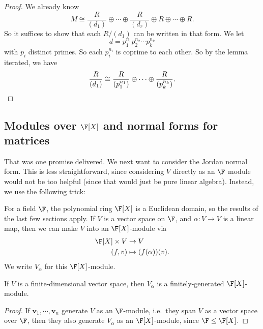 \documentclass[a4paper]{article}
\begin{document}
\begin{proof}
  We already know
  \[
    M \cong \frac{R}{(d_1)} \oplus \cdots \oplus \frac{R}{(d_r)} \oplus R \oplus \cdots \oplus R.
  \]
  So it suffices to show that each $R/(d_1)$ can be written in that form. We let
  \[
    d = p_1^{n_1} p_2^{n_2} \cdots p_k^{n_k}
  \]
  with $p_i$ distinct primes. So each $p_i^{n_i}$ is coprime to each other. So by the lemma iterated, we have
  \[
    \frac{R}{(d_1)} \cong \frac{R}{(p_1^{n_1})} \oplus\cdots \oplus \frac{R}{(p_k^{n_k})}.\qedhere
  \]
\end{proof}

\subsection{Modules over \texorpdfstring{$\F[X]$}{F[X]} and normal forms for matrices}
That was one promise delivered. We next want to consider the Jordan normal form. This is less straightforward, since considering $V$ directly as an $\F$ module would not be too helpful (since that would just be pure linear algebra). Instead, we use the following trick:

For a field $\F$, the polynomial ring $\F[X]$ is a Euclidean domain, so the results of the last few sections apply. If $V$ is a vector space on $\F$, and $\alpha: V \to V$ is a linear map, then we can make $V$ into an $\F[X]$-module via
\begin{align*}
  \F[X] \times V &\to V\\
  (f, v) &\mapsto (f(\alpha))(v).
\end{align*}
We write $V_\alpha$ for this $\F[X]$-module.

\begin{lemma}
  If $V$ is a finite-dimensional vector space, then $V_\alpha$ is a finitely-generated $\F[X]$-module.
\end{lemma}

\begin{proof}
  If $\mathbf{v}_1, \cdots, \mathbf{v}_n$ generate $V$ as an $\F$-module, i.e.\ they span $V$ as a vector space over $\F$, then they also generate $V_\alpha$ as an $\F[X]$-module, since $\F \leq \F[X]$.
\end{proof}
\end{document}
